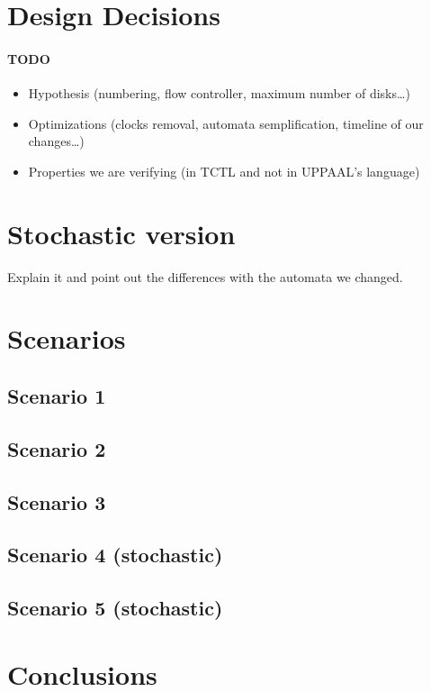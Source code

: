 \documentclass[a4paper]{article}
\begin{document}
    \section{Design Decisions} \label{section:design_decisions}

    \paragraph{TODO}
    \begin{itemize}
        \item Hypothesis (numbering, flow controller, maximum number of disks\dots)
        \item Optimizations (clocks removal, automata semplification, timeline of our changes\dots)
        \item Properties we are verifying (in TCTL and not in UPPAAL's language)
    \end{itemize}

    \section{Stochastic version}

    Explain it and point out the differences with the automata we changed.

    \section{Scenarios}

    \subsection{Scenario 1}

    \subsection{Scenario 2}

    \subsection{Scenario 3}

    \subsection{Scenario 4 (stochastic)}

    \subsection{Scenario 5 (stochastic)}

    \section{Conclusions}
\end{document}
